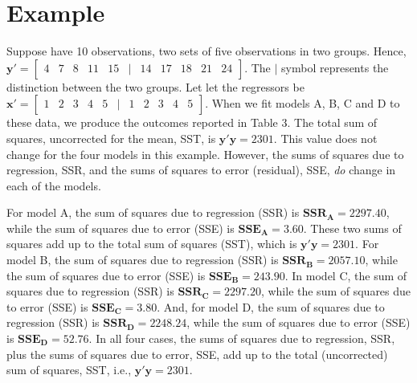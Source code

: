 \documentclass[11pt, oneside]{article}   	%
\begin{document}
\section{Example}
Suppose have 10 observations, two sets of five observations in two groups. Hence, \(\mathbf{y'} = \left[ \begin{array}{ccccccccccc}4 & 7 & 8 & 11 & 15 & | & 14 & 17 & 18 & 21 & 24  \end{array} \right]\).  The $ | $ symbol represents the distinction between the two groups. Let let the regressors be \(\mathbf{x'} = \left[ \begin{array}{ccccccccccc}1 & 2 & 3 & 4 & 5 & | & 1 & 2 & 3 & 4 & 5  \end{array} \right]\).  When we fit models A, B, C and D to these data, we produce the outcomes reported in Table 3. The total sum of squares, uncorrected for the mean, SST, is $  \mathbf{y} ' \mathbf{y} = 2301  $.  This value does not change for the four models in this example.  However, the sums of squares due to regression, SSR, and the sums of squares to error (residual), SSE, \emph{do} change in each of the models.       
\bigskip
\vspace{2 mm}

For model A, the sum of squares due to regression (SSR) is $ \mathbf{SSR_{A}} = 2297.40 $, while the sum of squares due to error (SSE) is $ \mathbf{SSE_{A}} = 3.60 $. These two sums of squares add up to the total sum of squares (SST), which is  $ \mathbf{y'y} = 2301$.  For model B, the sum of squares due to regression (SSR) is $ \mathbf{SSR_{B}} = 2057.10 $, while the sum of squares due to error (SSE) is $ \mathbf{SSE_{B}} = 243.90 $.   In model C, the sum of squares due to regression (SSR) is $ \mathbf{SSR_{C}} = 2297.20 $, while the sum of squares due to error (SSE) is $ \mathbf{SSE_{C}} = 3.80 $.  And, for model D, the sum of squares due to regression (SSR) is $ \mathbf{SSR_{D}} = 2248.24 $, while the sum of squares due to error (SSE) is $ \mathbf{SSE_{D}} = 52.76 $.  In all four cases, the sums of squares due to regression, SSR, plus the sums of squares due to error, SSE, add up to the total (uncorrected) sum of squares, SST, i.e., $ \mathbf{y'y} = 2301$.  

\bigskip
\end{document}
